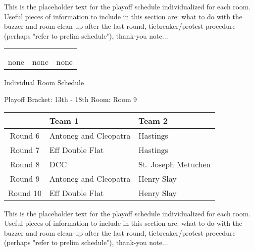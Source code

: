\documentclass{article}%
\begin{document}
\vspace*{16pt}%
\linebreak%
This is the placeholder text for the playoff schedule individualized for each room. Useful pieces of information to include in this section are: what to do with the buzzer and room clean{-}up after the last round, tiebreaker/protest procedure (perhaps "refer to prelim schedule"), thank{-}you note...%
\vspace*{30pt}%
\newline%
%
\begin{tabularx}{\textwidth}{YYY}%
  &  &  \\%
\\%
none&none&none\\%
\end{tabularx}%
\newpage%
\begin{center}%
\begin{Huge}%
Individual Room Schedule%
\end{Huge}%
\vspace*{16pt}%
\linebreak%
\begin{Large}%
Playoff Bracket: 13th - 18th \hfill Room: Room 9%
\end{Large}%
\end{center}%
%
\begin{tabularx}{\textwidth}{|c|Y|Y|}%
\hline%
&Team 1&Team 2\\%
\hline%
Round 6&Antoneg and Cleopatra&Hastings\\%
Round 7&Eff Double Flat&Hastings\\%
Round 8&DCC&St. Joseph Metuchen\\%
Round 9&Antoneg and Cleopatra&Henry Slay\\%
Round 10&Eff Double Flat&Henry Slay\\%
\hline%
\end{tabularx}%
\vspace*{16pt}%
\linebreak%
This is the placeholder text for the playoff schedule individualized for each room. Useful pieces of information to include in this section are: what to do with the buzzer and room clean{-}up after the last round, tiebreaker/protest procedure (perhaps "refer to prelim schedule"), thank{-}you note...%
\vspace*{30pt}%
\newline%
\end{document}
